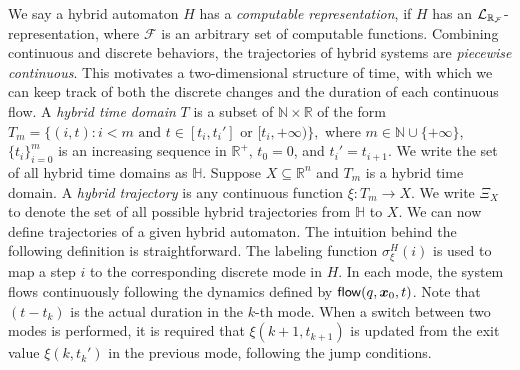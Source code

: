 We say a hybrid automaton $H$ has a {\em computable representation}, if $H$ has
an $\mathcal{L}_{\mathbb{R}_{\mathcal{F}}}$-representation, where $\mathcal{F}$ is an arbitrary set of computable
functions.
Combining continuous and discrete behaviors, the trajectories of hybrid systems are {\em piecewise continuous}. This motivates a two-dimensional structure of time, with which we can keep track of both the discrete changes and the duration of each continuous flow.
A {\em hybrid time domain} $T$ is a subset of $\mathbb{N}\times \mathbb{R}$ of the form
$T_m=\{(i, t): i<m \mbox{ and } t\in [t_i, t_i']\mbox{ or }[t_i, +\infty)\},$
where $m\in \mathbb{N}\cup\{+\infty\}$, $\{t_i\}_{i=0}^m$ is an increasing sequence in $\mathbb{R}^+$, $t_0= 0$, and $t_i'=t_{i+1}$.
We write the set of all hybrid time domains as $\mathbb{H}$.
Suppose $X\subseteq\mathbb{R}^n$ and $T_m$ is a hybrid time domain. A {\em hybrid trajectory} is any continuous function $\xi: T_m\rightarrow X.$
We write $\Xi_X$ to denote the set of all possible hybrid trajectories from $\mathbb{H}$ to $X$.
We can now define trajectories of a given hybrid automaton. The intuition behind the following definition is straightforward. The labeling function $\sigma_{\xi}^H(i)$ is used to map a step $i$ to the corresponding discrete mode in $H$. In each mode, the system flows continuously following the dynamics defined by $\flow(q, \vec x_0, t)$. Note that $(t-t_k)$ is the actual duration in the $k$-th mode. When a switch between two modes is performed, it is required
that $\xi(k+1, t_{k+1})$ is updated from the exit value $\xi(k, t_k')$ in the previous mode, following the jump conditions.

